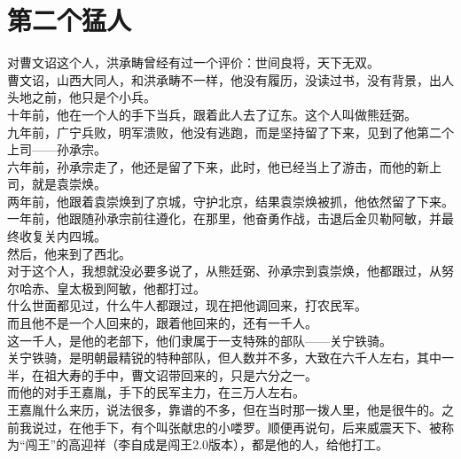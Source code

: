 \section{第二个猛人}
\ifnum{}
	\begin{multicols}{\theparacolNo}
\fi
对曹文诏这个人，洪承畴曾经有过一个评价：世间良将，天下无双。\\

曹文诏，山西大同人，和洪承畴不一样，他没有履历，没读过书，没有背景，出人头地之前，他只是个小兵。\\

十年前，他在一个人的手下当兵，跟着此人去了辽东。这个人叫做熊廷弼。\\

九年前，广宁兵败，明军溃败，他没有逃跑，而是坚持留了下来，见到了他第二个上司——孙承宗。\\

六年前，孙承宗走了，他还是留了下来，此时，他已经当上了游击，而他的新上司，就是袁崇焕。\\

两年前，他跟着袁崇焕到了京城，守护北京，结果袁崇焕被抓，他依然留了下来。\\

一年前，他跟随孙承宗前往遵化，在那里，他奋勇作战，击退后金贝勒阿敏，并最终收复关内四城。\\

然后，他来到了西北。\\

对于这个人，我想就没必要多说了，从熊廷弼、孙承宗到袁崇焕，他都跟过，从努尔哈赤、皇太极到阿敏，他都打过。\\

什么世面都见过，什么牛人都跟过，现在把他调回来，打农民军。\\

而且他不是一个人回来的，跟着他回来的，还有一千人。\\

这一千人，是他的老部下，他们隶属于一支特殊的部队——关宁铁骑。\\

关宁铁骑，是明朝最精锐的特种部队，但人数并不多，大致在六千人左右，其中一半，在祖大寿的手中，曹文诏带回来的，只是六分之一。\\

而他的对手王嘉胤，手下的民军主力，在三万人左右。\\

王嘉胤什么来历，说法很多，靠谱的不多，但在当时那一拨人里，他是很牛的。之前我说过，在他手下，有个叫张献忠的小喽罗。顺便再说句，后来威震天下、被称为“闯王”的高迎祥（李自成是闯王2.0版本），都是他的人，给他打工。\\


\end{multicols}
